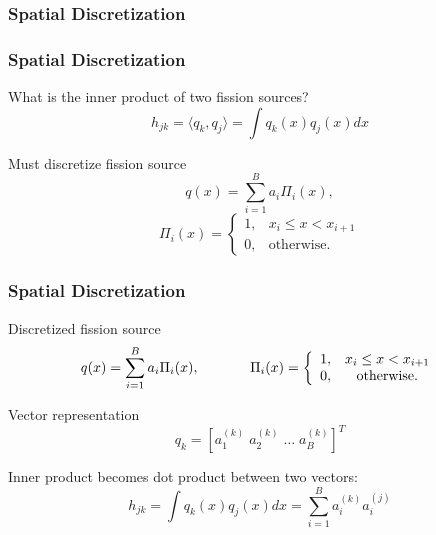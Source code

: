 \documentclass[color={usenames, dvipsnames},ignorenonframetext]{beamer}
\begin{document}
\subsubsection{Spatial Discretization}
\begin{frame}
    \frametitle{Spatial Discretization}
    What is the inner product of two fission sources?
    \begin{equation*}
        h_{jk} = \langle q_k,q_j\rangle = \int q_k(x)q_j(x) dx
    \end{equation*}

    \pause
    Must discretize fission source
    \begin{equation*}
        q(x) = \sum_{i=1}^B a_i \Pi_i(x),
    \end{equation*}
    \begin{equation*}
        \Pi_i(x) = \left \{
            \begin{array}{cc}
                1 ,& x_{i} \leq x < x_{i+1} \\
                0 ,& \mathrm{otherwise.}
            \end{array}\right. 
    \end{equation*}
\end{frame}

\begin{frame}
    \frametitle{Spatial Discretization}
    Discretized fission source
    \begin{equation*}
        q(x) = \sum_{i=1}^B a_i \Pi_i(x), \hspace{0.5in}
        \Pi_i(x) = \left \{
            \begin{array}{cc}
                1 ,& x_{i} \leq x < x_{i+1} \\
                0 ,& \mathrm{otherwise.}
            \end{array}\right. 
    \end{equation*}

    \pause
    Vector representation
    \begin{equation*}
        q_k = \left[a_1^{(k)}\; a_2^{(k)}\; \ldots\; a_B^{(k)}\right]^T
    \end{equation*}

    Inner product becomes dot product between two vectors:
    \begin{equation*}
        h_{jk} = \int q_k(x)q_j(x) dx = \sum_{i=1}^B a_i^{(k)}a_i^{(j)}
    \end{equation*}
\end{frame}
\end{document}
